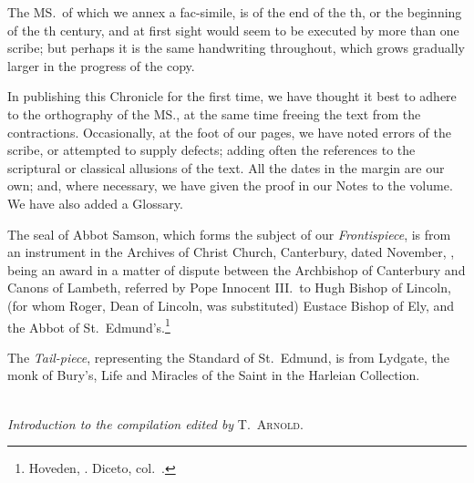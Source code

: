 \documentclass[10pt]{book}
\begin{document}
{The MS.\ of which we annex a fac-simile, is of the end of the th, or the beginning of the th century, and at first sight would seem to be executed by more than one scribe; but perhaps it is the same handwriting throughout, which grows gradually larger in the progress of the copy.

In publishing this Chronicle for the first time, we have thought it best to adhere to the orthography of the MS., at the same time freeing the text from the contractions. Occasionally, at the foot of our pages, we have noted errors of the scribe, or attempted to supply defects; adding often the references to the scriptural or classical allusions of the text. All the dates in the margin are our own; and, where necessary, we have given the proof in our Notes to the volume. We have also added a Glossary.

The seal of Abbot Samson, which forms the subject of our \emph{Frontispiece}, is from an instrument in the Archives of Christ Church, Canterbury, dated  November, , being an award in a matter of dispute between the Archbishop of Canterbury and Canons of Lambeth, referred by Pope Innocent III.\ to Hugh Bishop of Lincoln, (for whom Roger, Dean of Lincoln, was substituted) Eustace Bishop of Ely, and the Abbot of St.\ Edmund's.\footnote{Hoveden, . Diceto, col.\ .}

The \emph{Tail-piece}, representing the Standard of St.\ Edmund, is from Lydgate, the monk of Bury's, Life and Miracles of the Saint in the Harleian Collection.

}









\cleardoublepage


\begin{center}
{\fontsize{13}{13} \selectfont
{}\\}
\vspace{.2cm}
\emph{Introduction to the compilation edited by} \textsc{T.\ Arnold.}
\end{center}

\vspace{.15cm}
\end{document}

